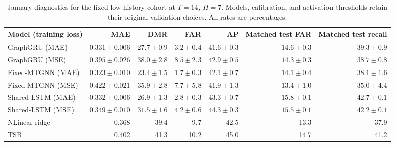 \begin{table}[!htbp]
\centering
\begingroup
\singlespacing
\fontsize{9pt}{10.5pt}\selectfont
\setlength{\tabcolsep}{4pt}
\renewcommand{\arraystretch}{1.08}
\caption{January diagnostics for the fixed low-history cohort at $T=14$, $H=7$. Models, calibration, and activation thresholds retain their original validation choices. All rates are percentages.}
\label{tab:january_low_history}
\begin{adjustbox}{max width=\linewidth}
\begin{tabular}{lrrrrrr}
\toprule
Model (training loss) & MAE & DMR & FAR & AP & Matched test FAR & Matched test recall \\
\midrule
GraphGRU (MAE) & $0.331\pm 0.006$ & $27.7\pm 0.9$ & $3.2\pm 0.4$ & $41.6\pm 0.3$ & $14.6\pm 0.3$ & $39.3\pm 0.9$ \\
GraphGRU (MSE) & $0.395\pm 0.026$ & $38.0\pm 2.8$ & $8.5\pm 2.3$ & $42.9\pm 0.5$ & $14.3\pm 0.3$ & $38.7\pm 0.8$ \\
Fixed-MTGNN (MAE) & $0.323\pm 0.010$ & $23.4\pm 1.5$ & $1.7\pm 0.3$ & $42.1\pm 0.7$ & $14.1\pm 0.4$ & $38.1\pm 1.6$ \\
Fixed-MTGNN (MSE) & $0.422\pm 0.021$ & $35.9\pm 2.8$ & $7.7\pm 5.8$ & $41.9\pm 1.3$ & $13.4\pm 1.0$ & $35.0\pm 4.4$ \\
Shared-LSTM (MAE) & $0.332\pm 0.006$ & $26.9\pm 1.3$ & $2.8\pm 0.3$ & $43.3\pm 0.7$ & $15.8\pm 0.1$ & $42.7\pm 0.1$ \\
Shared-LSTM (MSE) & $0.349\pm 0.010$ & $31.5\pm 1.6$ & $4.2\pm 0.6$ & $44.3\pm 0.3$ & $15.5\pm 0.1$ & $42.2\pm 0.1$ \\
NLinear-ridge & 0.368 & 39.4 & 9.7 & 42.5 & 13.3 & 37.9 \\
TSB & 0.402 & 41.3 & 10.2 & 45.0 & 14.7 & 41.2 \\
\bottomrule
\end{tabular}
\end{adjustbox}
\endgroup
\end{table}
